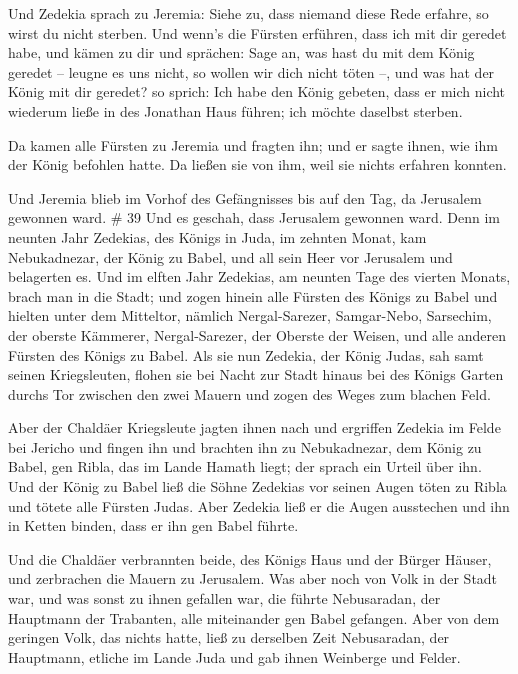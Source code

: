  Und Zedekia sprach zu Jeremia: Siehe zu, dass niemand
diese Rede erfahre, so wirst du nicht sterben.  Und
wenn's die Fürsten erführen, dass ich mit dir geredet habe, und kämen zu
dir und sprächen: Sage an, was hast du mit dem König geredet -- leugne
es uns nicht, so wollen wir dich nicht töten --, und was hat der König
mit dir geredet?  so sprich: Ich habe den König gebeten,
dass er mich nicht wiederum ließe in des Jonathan Haus führen; ich
möchte daselbst sterben.

 Da kamen alle Fürsten zu Jeremia und fragten ihn; und er
sagte ihnen, wie ihm der König befohlen hatte. Da ließen sie von ihm,
weil sie nichts erfahren konnten.

 Und Jeremia blieb im Vorhof des Gefängnisses bis auf den
Tag, da Jerusalem gewonnen ward. \# 39  Und es geschah,
dass Jerusalem gewonnen ward. Denn im neunten Jahr Zedekias, des Königs
in Juda, im zehnten Monat, kam Nebukadnezar, der König zu Babel, und all
sein Heer vor Jerusalem und belagerten es.  Und im elften
Jahr Zedekias, am neunten Tage des vierten Monats, brach man in die
Stadt;  und zogen hinein alle Fürsten des Königs zu Babel
und hielten unter dem Mitteltor, nämlich Nergal-Sarezer, Samgar-Nebo,
Sarsechim, der oberste Kämmerer, Nergal-Sarezer, der Oberste der Weisen,
und alle anderen Fürsten des Königs zu Babel.  Als sie nun
Zedekia, der König Judas, sah samt seinen Kriegsleuten, flohen sie bei
Nacht zur Stadt hinaus bei des Königs Garten durchs Tor zwischen den
zwei Mauern und zogen des Weges zum blachen Feld.

 Aber der Chaldäer Kriegsleute jagten ihnen nach und
ergriffen Zedekia im Felde bei Jericho und fingen ihn und brachten ihn
zu Nebukadnezar, dem König zu Babel, gen Ribla, das im Lande Hamath
liegt; der sprach ein Urteil über ihn.  Und der König zu
Babel ließ die Söhne Zedekias vor seinen Augen töten zu Ribla und tötete
alle Fürsten Judas.  Aber Zedekia ließ er die Augen
ausstechen und ihn in Ketten binden, dass er ihn gen Babel führte.

 Und die Chaldäer verbrannten beide, des Königs Haus und
der Bürger Häuser, und zerbrachen die Mauern zu Jerusalem.
 Was aber noch von Volk in der Stadt war, und was sonst zu
ihnen gefallen war, die führte Nebusaradan, der Hauptmann der Trabanten,
alle miteinander gen Babel gefangen.  Aber von dem
geringen Volk, das nichts hatte, ließ zu derselben Zeit Nebusaradan, der
Hauptmann, etliche im Lande Juda und gab ihnen Weinberge und Felder.

